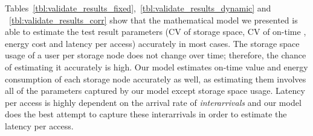 Tables~\ref{tbl:validate_results_fixed},~\ref{tbl:validate_results_dynamic} and ~\ref{tbl:validate_results_corr} show
that the mathematical model we presented is able to estimate the test result parameters (CV of storage space, CV of on-time
, energy cost and latency per access) accurately in most
cases. The storage space usage of a user per storage node does not change over time; therefore, the chance of
estimating it accurately is high. Our model estimates on-time value and energy consumption of each storage node accurately
as well, as estimating them involves all of the parameters captured by our model except storage space usage.
Latency per access is highly dependent on the arrival rate of \textit{interarrivals} and our model does the best attempt to
capture these interarrivals in order to estimate the latency per access.

